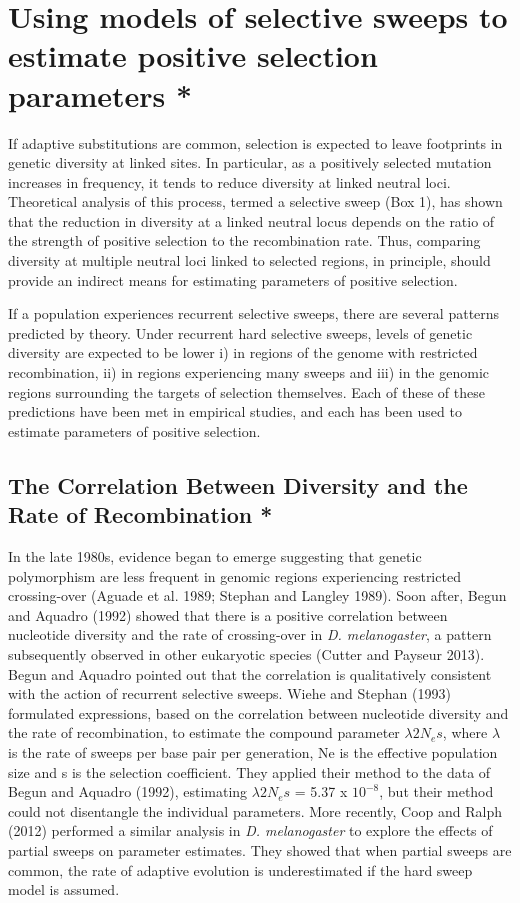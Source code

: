 \section[Using models of selective sweeps to estimate positive selection parameters]{Using models of selective sweeps to estimate positive selection parameters *}
 
If adaptive substitutions are common, selection is expected to leave footprints in genetic diversity at linked sites. In particular, as a positively selected mutation increases in frequency, it tends to reduce diversity at linked neutral loci. Theoretical analysis of this process, termed a selective sweep (Box 1), has shown that the reduction in diversity at a linked neutral locus depends on the ratio of the strength of positive selection to the recombination rate. Thus, comparing diversity at multiple neutral loci linked to selected regions, in principle, should provide an indirect means for estimating parameters of positive selection.
 

If a population experiences recurrent selective sweeps, there are several patterns predicted by theory. Under recurrent hard selective sweeps, levels of genetic diversity are expected to be lower i) in regions of the genome with restricted recombination, ii) in regions experiencing many sweeps and iii) in the genomic regions surrounding the targets of selection themselves. Each of these of these predictions have been met in empirical studies, and each has been used to estimate parameters of positive selection.


\subsection[Using models of selective sweeps to estimate positive selection parameters]{The Correlation Between Diversity and the Rate of Recombination *}

In the late 1980s, evidence began to emerge suggesting that genetic polymorphism are less frequent in genomic regions experiencing restricted crossing-over (Aguade et al. 1989; Stephan and Langley 1989). Soon after, Begun and Aquadro (1992) showed that there is a positive correlation between nucleotide diversity and the rate of crossing-over in \emph{D. melanogaster}, a pattern subsequently observed in other eukaryotic species (Cutter and Payseur 2013). Begun and Aquadro pointed out that the correlation is qualitatively consistent with the action of recurrent selective sweeps. Wiehe and Stephan (1993) formulated expressions, based on the correlation between nucleotide diversity and the rate of recombination, to estimate the compound parameter $\lambda 2N_{e}s$, where $\lambda$ is the rate of sweeps per base pair per generation, Ne is the effective population size and s is the selection coefficient. They applied their method to the data of Begun and Aquadro (1992), estimating $\lambda2N_{e}s$ = 5.37 x $10^{-8}$, but their method could not disentangle the individual parameters. More recently, Coop and Ralph (2012) performed a similar analysis in \emph{D. melanogaster} to explore the effects of partial sweeps on parameter estimates. They showed that when partial sweeps are common, the rate of adaptive evolution is underestimated if the hard sweep model is assumed.
 
